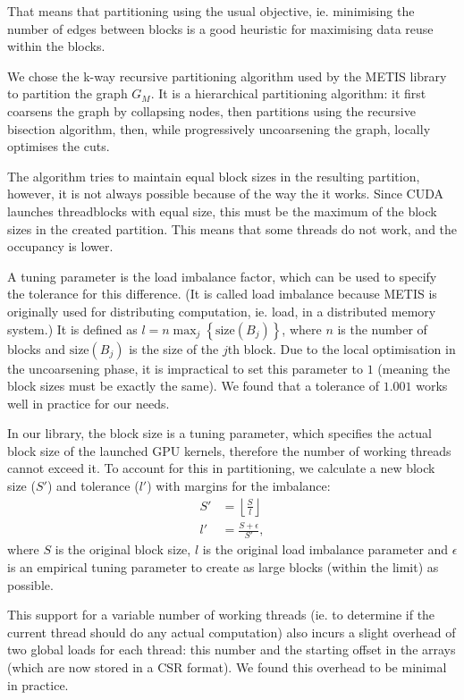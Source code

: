 That means that partitioning using the usual objective, ie. minimising the
number of edges between blocks is a good heuristic for maximising data reuse
within the blocks.

We chose the k-way recursive partitioning algorithm used by the
METIS\cite{metis} library to partition the graph $G_M$. It is a hierarchical
partitioning algorithm: it first coarsens the graph by collapsing nodes, then
partitions using the recursive bisection algorithm, then, while progressively
uncoarsening the graph, locally optimises the cuts.

The algorithm tries to maintain equal block sizes in the resulting partition,
however, it is not always possible because of the way the it works. Since CUDA
launches threadblocks with equal size, this must be the maximum of the block
sizes in the created partition. This means that some threads do not work, and
the occupancy is lower.

A tuning parameter is the load imbalance factor, which can be used to specify
the tolerance for this difference. (It is called load imbalance because METIS is
originally used for distributing computation, ie. load, in a distributed memory
system.) It is defined as $l = n\max_j \left\{\mathrm{size}(B_j) \right\}$,
where $n$ is the number of blocks and $\mathrm{size}(B_j)$ is the size of the
$j$th block. Due to the local optimisation in the uncoarsening phase, it is
impractical to set this parameter to $1$ (meaning the block sizes must be
exactly the same). We found that a tolerance of $1.001$ works well in practice
for our needs.

In our library, the block size is a tuning parameter, which specifies the actual
block size of the launched GPU kernels, therefore the number of working threads
cannot exceed it. To account for this in partitioning, we calculate a new block
size ($S'$) and tolerance ($l'$) with margins for the imbalance:
\begin{align}
  S' &= \left\lfloor \frac{S}{l} \right\rfloor \\
  l' &= \frac{S + \epsilon}{S'},
\end{align}
where $S$ is the original block size, $l$ is the original load imbalance
parameter and $\epsilon$ is an empirical tuning parameter to create as large
blocks (within the limit) as possible.

This support for a variable number of working threads (ie. to determine if the
current thread should do any actual computation) also incurs a slight overhead
of two global loads for each thread: this number and the starting offset in the
arrays (which are now stored in a CSR format). We found this overhead to be
minimal in practice.

